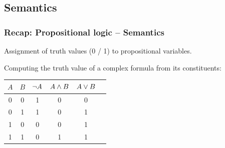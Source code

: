 \documentclass{beamer}
\begin{document}
\subsection{Semantics}


\begin{frame}[fragile]\frametitle{Recap: Propositional logic -- Semantics}


   Assignment of truth values (0 / 1) to propositional variables.

  Computing the truth value of a complex formula from its constituents:
  
  \begin{center}
  \begin{tabular}{|c|c||c|c|c|c|}
    \hline
    $A$ & $B$ &  $\neg A$ & $A \wedge B$ & $A \vee B$ \\
    \hline
    0   & 0   &  1 & 0          & 0	\\
    0   & 1   &  1 & 0          & 1    \\
    1   & 0   &  0 & 0          & 1	\\
    1   & 1   &  0 & 1          & 1	\\
    \hline
  \end{tabular}
  \end{center}

\end{frame}
\end{document}

